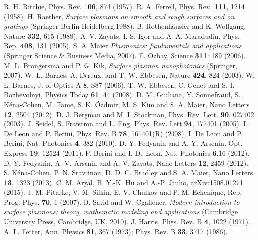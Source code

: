 \documentclass[aps,reprint]{revtex4-1}
\begin{document}
\begin{thebibliography}{9}
R. H. Ritchie, Phys. Rev. \textbf{106}, 874 (1957).
R. A. Ferrell, Phys. Rev. \textbf{111}, 1214 (1958).
H. Raether, \textit{Surface plasmons on smooth and rough surfaces and on gratings} (Springer Berlin Heidelberg,1988).
B. Rothenh\"{a}usler and K. Wolfgang, Nature \textbf{332}, 615 (1988).
A. V. Zayats, I. S. Igor and A. A. Maradudin, Phys. Rep. \textbf{408}, 131 (2005).
S. A. Maier \textit{Plasmonics: fundamentals and applications} (Springer Science \& Business Media, 2007).
E. Ozbay, Science \textbf{311}: 189 (2006).
M. L. Brongersma and P. G. Kik, \textit{Surface plasmon nanophotonics} (Springer, 2007).
W. L. Barnes, A. Dereux, and T. W. Ebbesen, Nature \textbf{424}, 824 (2003).
W. L. Barnes, J. of Optics A \textbf{8}, S87 (2006).
T. W. Ebbesen, C. Genet and S. I. Bozhevolnyi, Physics Today \textbf{61}, 44 (2008).
D. M. Giuliana, Y. Sonnefraud, S. K\'{e}na-Cohen, M. Tame, S. K. \"{O}zdmir, M. S. Kim and S. A. Maier, Nano Letters \textbf{12}, 2504 (2012).
D. J. Bergman and M. I. Stockman, Phys. Rev. Lett. \textbf{90}, 027402 (2003).
J. Seidel, S. Frafstron and L. Eng, Phys. Rev. Lett.\textbf{94}, 177401 (2005).
I. De Leon and P. Berini, Phys. Rev. B \textbf{78}, 161401(R) (2008).
I. De Leon and P. Berini, Nat. Photonics \textbf{4}, 382 (2010).
D. Y. Fedyanin and A. Y. Arsenin, Opt. Express \textbf{19}, 12524 (2011).
P. Berini and I. De Leon, Nat. Photonics \textbf{6},16 (2012).
D. Y. Fedyanin, A. V. Arsenin and A. V. Zayats, Nano Letters \textbf{12}, 2459 (2012).
S. K\'{e}na-Cohen, P. N. Stavrinou, D. D. C. Bradley and S. A. Maier, Nano Letters \textbf{13}, 1323 (2013).
C. M. Aryal, B. Y.-K. Hu and A.-P. Jauho, arXiv:1508.01271 (2015).
J. M. Pitarke, V. M. Silkin, E. V. Chulkov and P. M. Echenique, Rep. Prog. Phys. \textbf{70}, 1 (2007).
D. Sarid and W. Cgallener, \textit{Modern introduction to surface plasmons: theory, mathematic modeling and applications} (Cambridge University Press, Cambridge, UK, 2010).
J. Harris, Phys. Rev. B \textbf{4}, 1022 (1971).
A. L. Fetter, Ann. Physics \textbf{81}, 367 (1973); Phys. Rev. B \textbf{33}, 3717 (1986).

\end{thebibliography}
\end{document}
